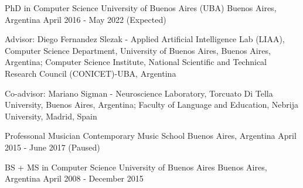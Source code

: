 

\begin{cventries}

  \cventry
    {PhD in Computer Science} %
    {University of Buenos Aires (UBA)} %
    {Buenos Aires, Argentina} %
    {April 2016 - May 2022 (Expected)} %
    {
      \begin{cvitems} %
        \item Advisor: Diego Fernandez Slezak - Applied Artificial Intelligence Lab (LIAA),
Computer Science Department, University of Buenos Aires, Buenos Aires, Argentina;
Computer Science Institute, National Scientific and Technical Research Council
(CONICET)-UBA, Argentina
        \item Co-advisor: Mariano Sigman - Neuroscience Laboratory, Torcuato Di
        Tella University, Buenos Aires, Argentina; Faculty of 
        Language and Education, Nebrija University, Madrid, Spain
      \end{cvitems}
    }

  \cventry
    {Professonal Musician} %
    {Contemporary Music School} %
    {Buenos Aires, Argentina} %
    {April 2015 - June 2017 (Paused)} %
    {}

  \cventry
    {BS + MS in Computer Science} %
    {University of Buenos Aires} %
    {Buenos Aires, Argentina} %
    {April 2008 - December 2015} %
    {}

\end{cventries}
